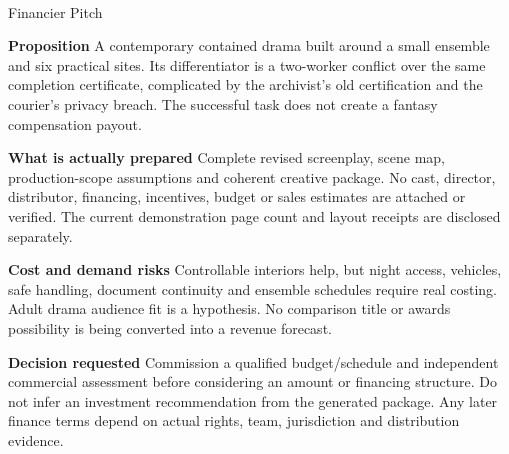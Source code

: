 \documentclass[11pt,letterpaper]{article}
\begin{document}
\begin{center}
{\Large\bfseries\sffamily \filmtitleupper}\\[6pt]
Financier Pitch
\end{center}
\textbf{Proposition} A contemporary contained drama built around a small ensemble and six practical sites. Its differentiator is a two-worker conflict over the same completion certificate, complicated by the archivist's old certification and the courier's privacy breach. The successful task does not create a fantasy compensation payout.

\textbf{What is actually prepared} Complete revised screenplay, scene map, production-scope assumptions and coherent creative package. No cast, director, distributor, financing, incentives, budget or sales estimates are attached or verified. The current demonstration page count and layout receipts are disclosed separately.

\textbf{Cost and demand risks} Controllable interiors help, but night access, vehicles, safe handling, document continuity and ensemble schedules require real costing. Adult drama audience fit is a hypothesis. No comparison title or awards possibility is being converted into a revenue forecast.

\textbf{Decision requested} Commission a qualified budget/schedule and independent commercial assessment before considering an amount or financing structure. Do not infer an investment recommendation from the generated package. Any later finance terms depend on actual rights, team, jurisdiction and distribution evidence.
\end{document}
